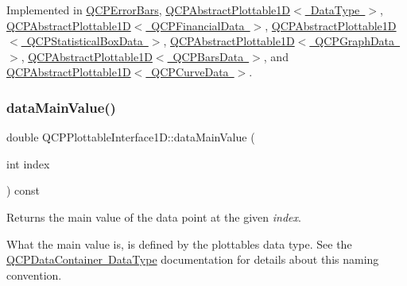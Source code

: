 Implemented in \mbox{\hyperlink{class_q_c_p_error_bars_ae3931213f76cd34a824c42c22a1dca74}{Q\+C\+P\+Error\+Bars}}, \mbox{\hyperlink{class_q_c_p_abstract_plottable1_d_ab14ab428595856bf76e04499017fa8dc}{Q\+C\+P\+Abstract\+Plottable1\+D$<$ Data\+Type $>$}}, \mbox{\hyperlink{class_q_c_p_abstract_plottable1_d_ab14ab428595856bf76e04499017fa8dc}{Q\+C\+P\+Abstract\+Plottable1\+D$<$ Q\+C\+P\+Financial\+Data $>$}}, \mbox{\hyperlink{class_q_c_p_abstract_plottable1_d_ab14ab428595856bf76e04499017fa8dc}{Q\+C\+P\+Abstract\+Plottable1\+D$<$ Q\+C\+P\+Statistical\+Box\+Data $>$}}, \mbox{\hyperlink{class_q_c_p_abstract_plottable1_d_ab14ab428595856bf76e04499017fa8dc}{Q\+C\+P\+Abstract\+Plottable1\+D$<$ Q\+C\+P\+Graph\+Data $>$}}, \mbox{\hyperlink{class_q_c_p_abstract_plottable1_d_ab14ab428595856bf76e04499017fa8dc}{Q\+C\+P\+Abstract\+Plottable1\+D$<$ Q\+C\+P\+Bars\+Data $>$}}, and \mbox{\hyperlink{class_q_c_p_abstract_plottable1_d_ab14ab428595856bf76e04499017fa8dc}{Q\+C\+P\+Abstract\+Plottable1\+D$<$ Q\+C\+P\+Curve\+Data $>$}}.

\mbox{\label{class_q_c_p_plottable_interface1_d_af6330919e8023277d08c958a6074fc76}} 
\subsubsection{\texorpdfstring{data\+Main\+Value()}{dataMainValue()}}
{\footnotesize\ttfamily double Q\+C\+P\+Plottable\+Interface1\+D\+::data\+Main\+Value (\begin{DoxyParamCaption}\item[{int}]{index }\end{DoxyParamCaption}) const\hspace{0.3cm}{\ttfamily [pure virtual]}}

Returns the main value of the data point at the given {\itshape index}.

What the main value is, is defined by the plottable\textquotesingle{}s data type. See the \mbox{\hyperlink{class_q_c_p_data_container_qcpdatacontainer-datatype}{Q\+C\+P\+Data\+Container Data\+Type}} documentation for details about this naming convention. 

